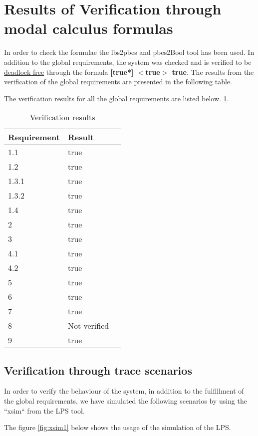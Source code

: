\section*{Results of Verification through modal calculus formulas}
In order to check the formulae the lbs2pbes and pbes2Bool tool has been used. In addition to the global requirements, the system was checked and is verified to be \underline{deadlock free} through the formula  \textbf{[true*] $<$true$>$ true}. The results from the verification of the global requirements are presented in the following table.

The verification results for all the global requirements are listed below. \ref{tab: verification}.

\begin{table}[h]
\centering
\begin{tabular}{|l|l|l|}\hline
Requirement & Result \\\hline
1.1 & true  \\\hline
1.2 & true \\\hline
1.3.1 & true \\\hline
1.3.2 & true \\\hline
1.4 & true \\\hline
2 &  true \\\hline
3 &  true \\\hline
4.1 &  true \\\hline
4.2 &  true \\\hline
5 &  true \\\hline
6 &  true \\\hline
7 &  true \\\hline
8 &  Not verified\\\hline
9 &  true \\\hline

\end{tabular}
\caption{Verification results}
\label{tab: verification}
\end{table}

\subsection*{Verification through trace scenarios}
In order to verify the behaviour of the system, in addition to the fulfillment of the global requirements, we have simulated the following scenarios by using the ``xsim`` from the LPS tool.

The figure \ref{fig:xsim1} below shows the usage of the simulation of the LPS.

